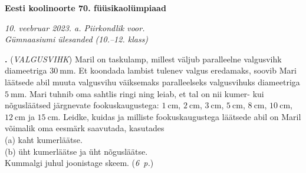\documentclass[11pt,a5paper]{article}
\newcommand{\numb}[1]{\vspace{5pt}\textbf{\large #1}}
\newcommand{\nimi}[1]{(\textsl{\small #1})}
\newcommand{\punktid}[1]{(\emph{#1~p.})}
\newcounter{ylesanne}
\newcommand{\yl}[1]{\addtocounter{ylesanne}{1}\numb{\theylesanne.} \nimi{#1} \newblock{}}
\newcommand{\autor}[1]{}%
\begin{document}
\begin{center}
  \textbf{\Large Eesti koolinoorte 70. füüsikaolümpiaad} \par
  \emph{10. veebruar 2023. a. Piirkondlik voor.\\Gümnaasiumi ülesanded (10.--12. klass)}
\end{center}

 \par


\yl{VALGUSVIHK} Maril on taskulamp, millest väljub paralleelne valgusvihk diameetriga $\SI{30}{\mm}$. Et koondada lambist tulenev valgus eredamaks, soovib Mari läätsede abil muuta valgusvihu väiksemaks paralleelseks valgusvihuks diameetriga $\SI{5}{\mm}$. Mari tuhnib oma sahtlis ringi ning leiab, et tal on nii kumer- kui nõgusläätsed järgnevate fookuskaugustega: $\SI{1}{\cm}$, $\SI{2}{\cm}$, $\SI{3}{\cm}$, $\SI{5}{\cm}$, $\SI{8}{\cm}$, $\SI{10}{\cm}$, $\SI{12}{\cm}$ ja $\SI{15}{\cm}$. Leidke, kuidas ja milliste fookuskaugustega läätsede abil on Maril võimalik oma eesmärk saavutada, kasutades
\\ (a) kaht kumerläätse.
\\ (b) üht kumerläätse ja üht nõgusläätse.
\\ Kummalgi juhul joonistage skeem.
\punktid{6} \autor{Richard Luhtaru}
\end{document}
